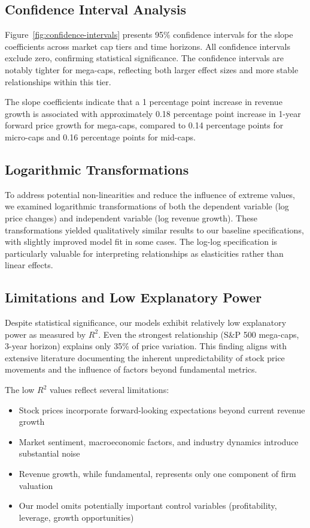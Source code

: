 \documentclass[11pt]{article}
\begin{document}
\subsection{Confidence Interval Analysis}

Figure~\ref{fig:confidence-intervals} presents 95\% confidence intervals for the slope coefficients across market cap tiers and time horizons. All confidence intervals exclude zero, confirming statistical significance. The confidence intervals are notably tighter for mega-caps, reflecting both larger effect sizes and more stable relationships within this tier.

The slope coefficients indicate that a 1 percentage point increase in revenue growth is associated with approximately 0.18 percentage point increase in 1-year forward price growth for mega-caps, compared to 0.14 percentage points for micro-caps and 0.16 percentage points for mid-caps.

\subsection{Logarithmic Transformations}

To address potential non-linearities and reduce the influence of extreme values, we examined logarithmic transformations of both the dependent variable (log price changes) and independent variable (log revenue growth). These transformations yielded qualitatively similar results to our baseline specifications, with slightly improved model fit in some cases. The log-log specification is particularly valuable for interpreting relationships as elasticities rather than linear effects.

\subsection{Limitations and Low Explanatory Power}

Despite statistical significance, our models exhibit relatively low explanatory power as measured by $R^2$. Even the strongest relationship (S\&P 500 mega-caps, 3-year horizon) explains only 35\% of price variation. This finding aligns with extensive literature documenting the inherent unpredictability of stock price movements and the influence of factors beyond fundamental metrics.

The low $R^2$ values reflect several limitations:
\begin{itemize}
\item Stock prices incorporate forward-looking expectations beyond current revenue growth
\item Market sentiment, macroeconomic factors, and industry dynamics introduce substantial noise
\item Revenue growth, while fundamental, represents only one component of firm valuation
\item Our model omits potentially important control variables (profitability, leverage, growth opportunities)
\end{itemize}
\end{document}
